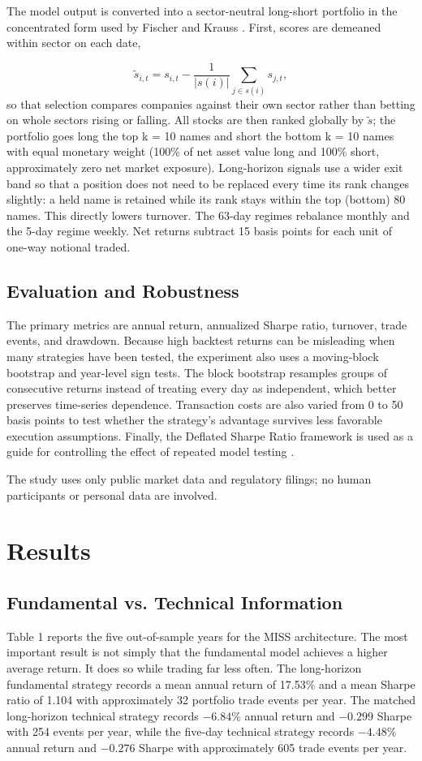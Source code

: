 \documentclass[12pt]{article}
\begin{document}
The model output is converted into a sector-neutral long-short portfolio in the concentrated form used by Fischer and Krauss \cite{fischer2018}. First, scores are demeaned within sector on each date,

\begin{equation*}
\tilde{s}_{i,t} = s_{i,t} - \frac{1}{|s(i)|}\sum_{j\in s(i)} s_{j,t},
\end{equation*}
so that selection compares companies against their own sector rather than betting on whole sectors rising or falling. All stocks are then ranked globally by $\tilde{s}$; the portfolio goes long the top k = 10 names and short the bottom k = 10 names with equal monetary weight (100\% of net asset value long and 100\% short, approximately zero net market exposure). Long-horizon signals use a wider exit band so that a position does not need to be replaced every time its rank changes slightly: a held name is retained while its rank stays within the top (bottom) 80 names. This directly lowers turnover. The 63-day regimes rebalance monthly and the 5-day regime weekly. Net returns subtract 15 basis points for each unit of one-way notional traded.

\subsection{Evaluation and Robustness}
The primary metrics are annual return, annualized Sharpe ratio, turnover, trade events, and drawdown. Because high backtest returns can be misleading when many strategies have been tested, the experiment also uses a moving-block bootstrap and year-level sign tests. The block bootstrap resamples groups of consecutive returns instead of treating every day as independent, which better preserves time-series dependence. Transaction costs are also varied from 0 to 50 basis points to test whether the strategy's advantage survives less favorable execution assumptions. Finally, the Deflated Sharpe Ratio framework is used as a guide for controlling the effect of repeated model testing \cite{bailey2014}.

The study uses only public market data and regulatory filings; no human participants or personal data are involved.

\section{Results}
\subsection{Fundamental vs. Technical Information}
Table 1 reports the five out-of-sample years for the MISS architecture. The most important result is not simply that the fundamental model achieves a higher average return. It does so while trading far less often. The long-horizon fundamental strategy records a mean annual return of 17.53\% and a mean Sharpe ratio of 1.104 with approximately 32 portfolio trade events per year. The matched long-horizon technical strategy records $-6.84\%$ annual return and $-0.299$ Sharpe with 254 events per year, while the five-day technical strategy records $-4.48\%$ annual return and $-0.276$ Sharpe with approximately 605 trade events per year.
\end{document}
